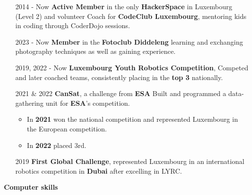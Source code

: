 \documentclass{article}
\begin{document}
\begin{minipage}[t]{0.7\textwidth}
    \begin{itemize}

        \item [2014 - Now] \textbf{Active Member} in the only \textbf{HackerSpace} in Luxembourg (Level 2) and volunteer Coach for \textbf{CodeClub Luxembourg}, mentoring kids in coding through CoderDojo sessions.

        
    	\item [2023 - Now] \textbf{Member} in the \textbf{Fotoclub Diddeleng} learning and exchanging photography techniques as well as gaining experience. 

    	\item [2019, 2022 - Now] \textbf{Luxembourg Youth Robotics Competition}, Competed and later coached teams, consistently placing in the \textbf{top 3} nationally. 

    	\item [2021 \& 2022] \textbf{CanSat}, a challenge from \textbf{ESA} 
        Built and programmed a data-gathering unit for \textbf{ESA}'s competition. 
            \begin{itemize}
    	           \item In \textbf{2021} won the national competition and represented Luxembourg in the European  competition. 
                   \item In \textbf{2022} placed 3rd. 
           \end{itemize}
           
       	\item [2019] \textbf{First Global Challenge}, represented Luxembourg in an international robotics competition in \textbf{Dubai} after excelling in LYRC. 

    \end{itemize}
\end{minipage}%









\vspace{0.5cm} %
\centering %
\dotfill \textbf{\Large Computer skills } \dotfill
\vspace{0.5cm} %
\end{document}

